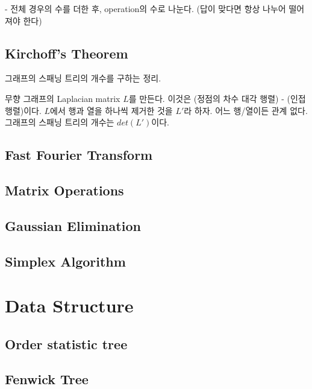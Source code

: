 \documentclass[10pt,landscape,a4paper,twocolumn]{article}
\begin{document}
- 전체 경우의 수를 더한 후, operation의 수로 나눈다. (답이 맞다면 항상 나누어 떨어져야 한다)

\subsection{Kirchoff's Theorem}

그래프의 스패닝 트리의 개수를 구하는 정리.

무향 그래프의 Laplacian matrix $L$를 만든다. 이것은 (정점의 차수 대각 행렬) - (인접행렬)이다.
$L$에서 행과 열을 하나씩 제거한 것을 $L'$라 하자. 어느 행/열이든 관계 없다.
그래프의 스패닝 트리의 개수는 $det(L')$이다.

\subsection{Fast Fourier Transform}


\subsection{Matrix Operations}


\subsection{Gaussian Elimination}


\subsection{Simplex Algorithm}



\section{Data Structure}

\subsection{Order statistic tree}


\subsection{Fenwick Tree}

\end{document}
